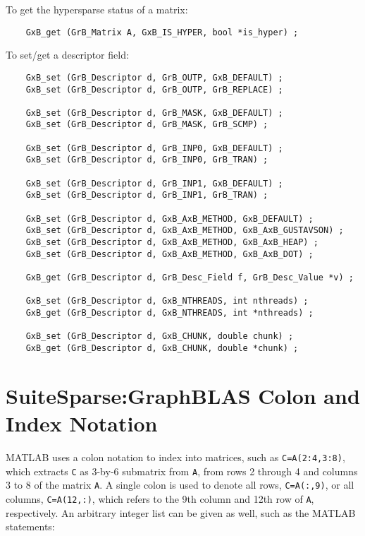 \documentclass[12pt]{article}
\begin{document}
\noindent
To get the hypersparse status of a matrix:

    {\footnotesize
    \begin{verbatim}
    GxB_get (GrB_Matrix A, GxB_IS_HYPER, bool *is_hyper) ; \end{verbatim} }

\noindent
To set/get a descriptor field:

    {\footnotesize
    \begin{verbatim}
    GxB_set (GrB_Descriptor d, GrB_OUTP, GxB_DEFAULT) ;
    GxB_set (GrB_Descriptor d, GrB_OUTP, GrB_REPLACE) ;

    GxB_set (GrB_Descriptor d, GrB_MASK, GxB_DEFAULT) ;
    GxB_set (GrB_Descriptor d, GrB_MASK, GrB_SCMP) ;

    GxB_set (GrB_Descriptor d, GrB_INP0, GxB_DEFAULT) ;
    GxB_set (GrB_Descriptor d, GrB_INP0, GrB_TRAN) ;

    GxB_set (GrB_Descriptor d, GrB_INP1, GxB_DEFAULT) ;
    GxB_set (GrB_Descriptor d, GrB_INP1, GrB_TRAN) ;

    GxB_set (GrB_Descriptor d, GxB_AxB_METHOD, GxB_DEFAULT) ;
    GxB_set (GrB_Descriptor d, GxB_AxB_METHOD, GxB_AxB_GUSTAVSON) ;
    GxB_set (GrB_Descriptor d, GxB_AxB_METHOD, GxB_AxB_HEAP) ;
    GxB_set (GrB_Descriptor d, GxB_AxB_METHOD, GxB_AxB_DOT) ;

    GxB_get (GrB_Descriptor d, GrB_Desc_Field f, GrB_Desc_Value *v) ;

    GxB_set (GrB_Descriptor d, GxB_NTHREADS, int nthreads) ;
    GxB_get (GrB_Descriptor d, GxB_NTHREADS, int *nthreads) ;

    GxB_set (GrB_Descriptor d, GxB_CHUNK, double chunk) ;
    GxB_get (GrB_Descriptor d, GxB_CHUNK, double *chunk) ; \end{verbatim} }

\newpage
\section{SuiteSparse:GraphBLAS Colon and Index Notation} %
\label{colon}

MATLAB uses a colon notation to index into matrices, such as
\verb'C=A(2:4,3:8)', which extracts \verb'C' as 3-by-6 submatrix from \verb'A',
from rows 2 through 4 and columns 3 to 8 of the matrix \verb'A'.  A single
colon is used to denote all rows, \verb'C=A(:,9)', or all columns,
\verb'C=A(12,:)', which refers to the 9th column and 12th row of \verb'A',
respectively.  An arbitrary integer list can be given as well, such as the
MATLAB statements:
\end{document}
